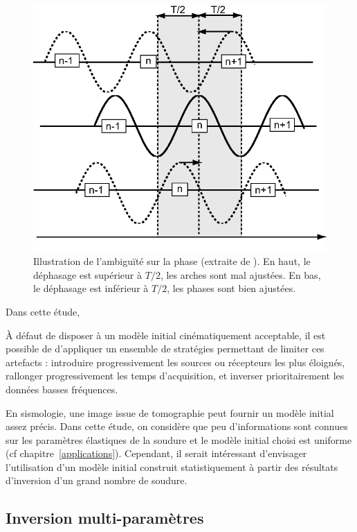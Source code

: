 \begin{figure}[!h]
	\includegraphics[scale=0.8]{img/ambig_phase.png}
	\caption{Illustration de l'ambiguïté sur la phase (extraite de \cite{brossier_these}). En haut, le déphasage est supérieur à $T/2$, les arches sont mal ajustées. En bas, le déphasage est inférieur à $T/2$, les phases sont bien ajustées. \label{ambig_phase}}
\end{figure}

 Dans cette étude, 

À défaut de disposer à un modèle initial cinématiquement acceptable, il est possible de d'appliquer un ensemble de stratégies permettant de limiter ces artefacts : introduire progressivement les sources ou récepteurs les plus éloignés, rallonger progressivement les temps d'acquisition, et inverser prioritairement les données basses fréquences.


En sismologie, une image issue de tomographie peut fournir un modèle initial assez précis. Dans cette étude, on considère que peu d'informations sont connues sur les paramètres élastiques de la soudure et le modèle initial choisi est uniforme (cf chapitre~\ref{applications}). Cependant, il serait intéressant d'envisager l'utilisation d'un modèle initial construit statistiquement à partir des résultats d'inversion d'un grand nombre de soudure.

\subsection{Inversion multi-paramètres}

